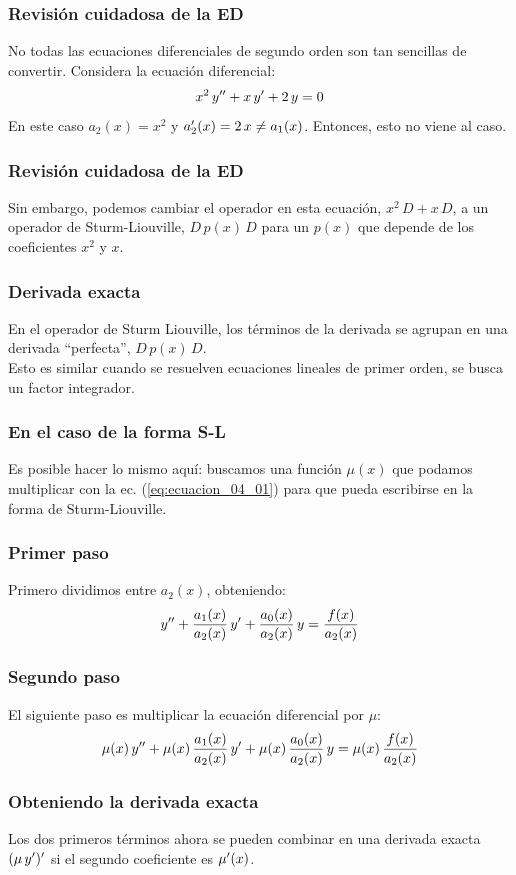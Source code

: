 \documentclass[12pt]{beamer}
\begin{document}
\begin{frame}
\frametitle{Revisión cuidadosa de la ED}
No todas las ecuaciones diferenciales de segundo orden son tan sencillas de convertir. 
\pause
Considera la ecuación diferencial:
\pause
\begin{align*}
x^{2} \, {y}^{\prime \prime} + x \, {y}^{\prime} + 2 \, y = 0
\end{align*}
En este caso $a_{2} (x) = x^{2}$ y ${a}^{\prime}_{2} (x) = 2 \, x \neq a_{1} (x)$. \pause Entonces, esto no viene al caso.
\end{frame}
\begin{frame}
\frametitle{Revisión cuidadosa de la ED}
Sin embargo, podemos cambiar el operador en esta ecuación, $x^{2} \, D + x \, D$, a un operador de Sturm-Liouville, $D \, p (x) \, D$ para un $p (x)$ que depende de los coeficientes $x^{2}$ y $x$.
\end{frame}
\begin{frame}
\frametitle{Derivada exacta}
En el operador de Sturm Liouville, los términos de la derivada se agrupan en una derivada \enquote{perfecta}, $D \, p (x) \, D$. 
\\
\bigskip
\pause
Esto es similar cuando se resuelven ecuaciones lineales de primer orden, se busca un factor integrador.
\end{frame}
\begin{frame}
\frametitle{En el caso de la forma S-L}
Es posible hacer lo mismo aquí: buscamos una función $\mu (x)$ que podamos multiplicar con la ec. (\ref{eq:ecuacion_04_01}) para que pueda escribirse en la forma de Sturm-Liouville.
\end{frame}
\begin{frame}
\frametitle{Primer paso}
Primero dividimos entre $a_{2} (x)$, obteniendo:
\pause
\begin{align*}
{y}^{\prime \prime} + \dfrac{a_{1} (x)}{a_{2} (x)} \, {y}^{\prime} + \dfrac{a_{0} (x)}{a_{2} (x)} \, y = \dfrac{f(x)}{a_{2} (x)}
\end{align*} 
\end{frame}
\begin{frame}
\frametitle{Segundo paso}
El siguiente paso es multiplicar la ecuación diferencial por $\mu$:
\pause
\begin{align*}
\mu (x) \, {y}^{\prime \prime} + \mu (x) \, \dfrac{a_{1} (x)}{a_{2} (x)} \, {y}^{\prime} + \mu (x) \, \dfrac{a_{0} (x)}{a_{2} (x)} \, y = \mu (x) \, \dfrac{f (x)}{a_{2} (x)}
\end{align*}
\end{frame}
\begin{frame}
\frametitle{Obteniendo la derivada exacta}
Los dos primeros términos ahora se pueden combinar en una derivada exacta $( \mu \, {y}^{\prime})^{\prime}$  si el segundo coeficiente es ${\mu}^{\prime} (x)$.
\end{frame}
\end{document}
